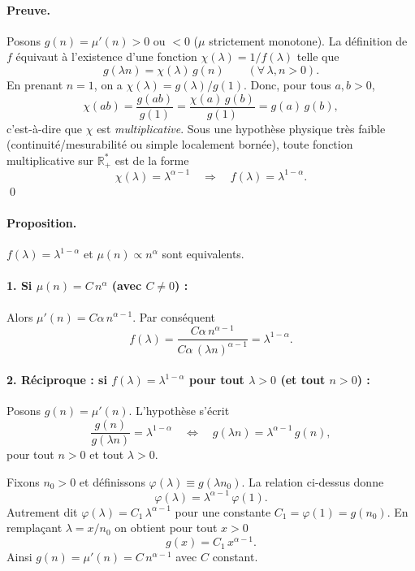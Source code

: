 \paragraph{Preuve.}
Posons \(g(n) = \mu'(n)>0\) ou \(<0\) (\ie $\mu$ strictement monotone). La définition de \(f\) équivaut à l’existence d’une fonction
\(\chi(\lambda)=1/f(\lambda)\) telle que
\[
g(\lambda n)=\chi(\lambda)\,g(n)\qquad(\forall\,\lambda,n>0).
\]
En prenant \(n=1\), on a \(\chi(\lambda)=g(\lambda)/g(1)\).
Donc, pour tous \(a,b>0\),
\[
\chi(ab)=\frac{g(ab)}{g(1)}=\frac{\chi(a)\,g(b)}{g(1)}=g(a)\,g(b),
\]
c’est-à-dire que \(\chi\) est \emph{multiplicative}. Sous une hypothèse physique très faible
(continuité/mesurabilité ou simple localement bornée), toute fonction multiplicative sur
\(\mathbb{R}_+^\ast\) est de la forme
\[
\chi(\lambda)=\lambda^{\alpha-1}
\quad\Rightarrow\quad
f(\lambda)=\lambda^{1-\alpha}.
\]
\qed


\paragraph{Proposition.}
$f(\lambda) = \lambda^{1-\alpha}$ et $\mu (n) \propto n^\alpha $ sont equivalents.
%

\paragraph{1. Si \(\mu(n)=C\,n^\alpha\) (avec \(C\neq0\)) :}
Alors \(\mu'(n)=C\alpha\,n^{\alpha-1}\). Par conséquent
\[
f(\lambda)=\frac{C\alpha\,n^{\alpha-1}}{C\alpha\,(\lambda n)^{\alpha-1}}
=\lambda^{1-\alpha}.
\]

\paragraph{2. Réciproque : si \(f(\lambda)=\lambda^{1-\alpha}\) pour tout \(\lambda>0\) (et tout \(n>0\)) :}
Posons \(g(n)=\mu'(n)\). L'hypothèse s'écrit
\[
\frac{g(n)}{g(\lambda n)}=\lambda^{1-\alpha}
\quad\Longleftrightarrow\quad
g(\lambda n)=\lambda^{\alpha-1}\,g(n),
\]
pour tout \(n>0\) et tout \(\lambda>0\).

Fixons \(n_0>0\) et définissons \(\varphi(\lambda)\equiv g(\lambda n_0)\). La relation ci-dessus donne
\[
\varphi(\lambda)=\lambda^{\alpha-1}\,\varphi(1).
\]
Autrement dit \(\varphi(\lambda)=C_1\,\lambda^{\alpha-1}\) pour une constante \(C_1=\varphi(1)=g(n_0)\). En remplaçant \(\lambda=x/n_0\) on obtient pour tout \(x>0\)
\[
g(x)=C_1\,x^{\alpha-1}.
\]
Ainsi \(g(n)=\mu'(n)=C\,n^{\alpha-1}\) avec \(C\) constant.

